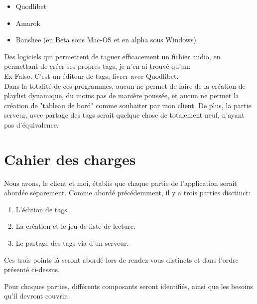 \documentclass[a4paper,12pt]{report}
\begin{document}
\begin{itemize}
\item Quodlibet
\item Amarok
\item Banshee (en Beta sous Mac-OS et en alpha sous Windows)
\end{itemize}

Des logiciels qui permettent de taguer efficacement un fichier audio, en permettant de créer ses propres tags, je n'en ai trouvé qu'un:\\

Ex Falso.
C'est un éditeur de tags, livrer avec Quodlibet.\\

Dans la totalité de ces programmes, aucun ne permet de faire de la création de playlist dynamique, du moins pas de manière poussée, et aucun ne permet la création de "tableau de bord" comme souhaiter par mon client.
De plus, la partie serveur, avec partage des tags serait quelque chose de totalement neuf, n'ayant pas d'équivalence.

\chapter{Cahier des charges}

Nous avons, le client et moi, établis que chaque partie de l'application serait abordée séparement. Comme abordé précédemment, il y a trois parties disctinct:\\

\begin{enumerate}
\item L'édition de tags.
\item La création et le jeu de liste de lecture.
\item Le partage des tags via d'un serveur.
\end{enumerate}

Ces trois points là seront abordé lors de rendez-vous distincts et dans l'ordre présenté ci-dessus.

Pour chaques parties, différents composants seront identifiés, ainsi que les besoins qu'il devront couvrir. 


\end{document}
